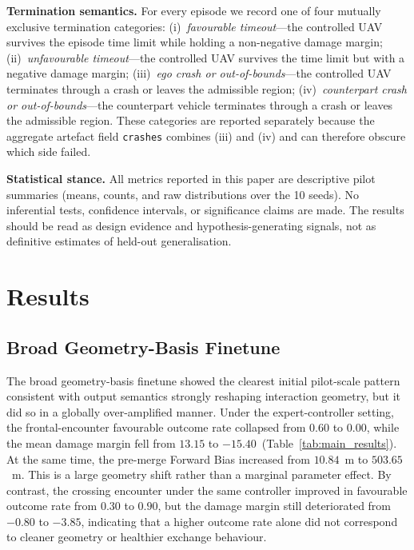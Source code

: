 \documentclass[drones,article,submit,pdftex,moreauthors]{Definitions/mdpi}
\begin{document}
\textbf{Termination semantics.} For every episode we record one of four mutually exclusive termination categories: (i)\ \emph{favourable timeout}---the controlled UAV survives the episode time limit while holding a non-negative damage margin; (ii)\ \emph{unfavourable timeout}---the controlled UAV survives the time limit but with a negative damage margin; (iii)\ \emph{ego crash or out-of-bounds}---the controlled UAV terminates through a crash or leaves the admissible region; (iv)\ \emph{counterpart crash or out-of-bounds}---the counterpart vehicle terminates through a crash or leaves the admissible region. These categories are reported separately because the aggregate artefact field \texttt{crashes} combines (iii) and (iv) and can therefore obscure which side failed.

\textbf{Statistical stance.} All metrics reported in this paper are descriptive pilot summaries (means, counts, and raw distributions over the 10 seeds). No inferential tests, confidence intervals, or significance claims are made. The results should be read as design evidence and hypothesis-generating signals, not as definitive estimates of held-out generalisation.

\section{Results}

\subsection{Broad Geometry-Basis Finetune}

The broad geometry-basis finetune showed the clearest initial pilot-scale pattern consistent with output semantics strongly reshaping interaction geometry, but it did so in a globally over-amplified manner. Under the expert-controller setting, the frontal-encounter favourable outcome rate collapsed from $0.60$ to $0.00$, while the mean damage margin fell from $13.15$ to $-15.40$~(Table~\ref{tab:main_results}). At the same time, the pre-merge Forward Bias increased from $10.84$~m to $503.65$~m. This is a large geometry shift rather than a marginal parameter effect. By contrast, the crossing encounter under the same controller improved in favourable outcome rate from $0.30$ to $0.90$, but the damage margin still deteriorated from $-0.80$ to $-3.85$, indicating that a higher outcome rate alone did not correspond to cleaner geometry or healthier exchange behaviour.
\end{document}
